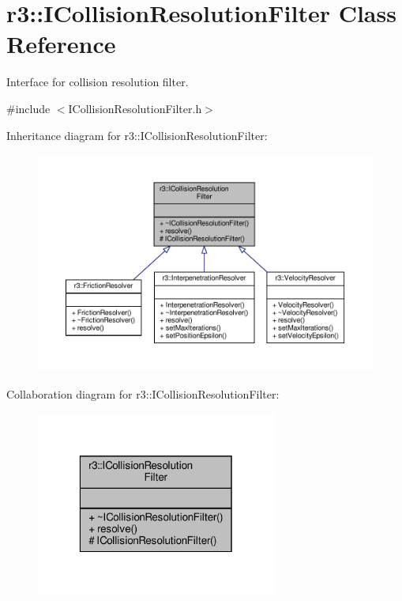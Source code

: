 \hypertarget{classr3_1_1_i_collision_resolution_filter}{}\section{r3\+:\+:I\+Collision\+Resolution\+Filter Class Reference}
\label{classr3_1_1_i_collision_resolution_filter}


Interface for collision resolution filter.  




{\ttfamily \#include $<$I\+Collision\+Resolution\+Filter.\+h$>$}



Inheritance diagram for r3\+:\+:I\+Collision\+Resolution\+Filter\+:\nopagebreak
\begin{figure}[H]
\begin{center}
\leavevmode
\includegraphics[width=350pt]{classr3_1_1_i_collision_resolution_filter__inherit__graph}
\end{center}
\end{figure}


Collaboration diagram for r3\+:\+:I\+Collision\+Resolution\+Filter\+:\nopagebreak
\begin{figure}[H]
\begin{center}
\leavevmode
\includegraphics[width=224pt]{classr3_1_1_i_collision_resolution_filter__coll__graph}
\end{center}
\end{figure}
